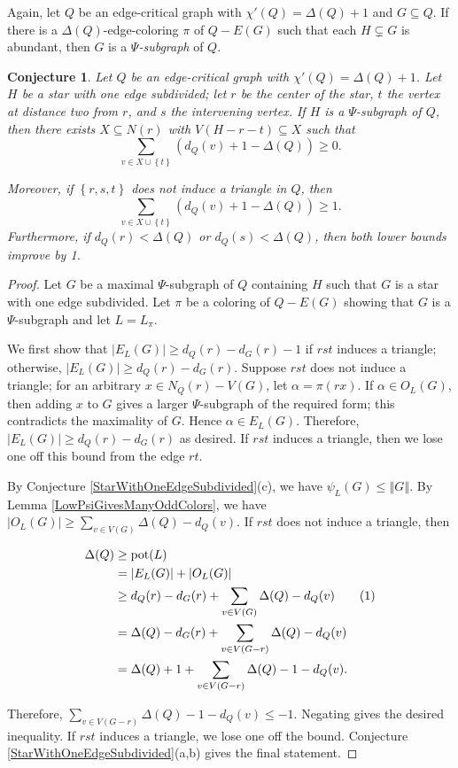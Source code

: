 \documentclass[12pt]{article}
\theoremstyle{plain}
\newtheorem{conjecture}[thm]{Conjecture}
\theoremstyle{definition}
\theoremstyle{remark}
\newcommand{\set}[1]{\left\{ #1 \right\}}
\newcommand{\card}[1]{\left|#1\right|}
\newcommand{\size}[1]{\left\Vert#1\right\Vert}
\newcommand{\pot}{\operatorname{pot}}
\newcommand\numberthis{\addtocounter{equation}{1}\tag{\theequation}}
\begin{document}
Again, let $Q$ be an edge-critical graph with $\chi'(Q) = \Delta(Q) + 1$ and $G
\subseteq Q$.  If there is a $\Delta(Q)$-edge-coloring $\pi$ of $Q - E(G)$ such
that each $H \subsetneq G$ is abundant, then $G$ is a \emph{$\Psi$-subgraph} of
$Q$.

\begin{conjecture}\label{AdjacencyPrecursor}
Let $Q$ be an edge-critical graph with $\chi'(Q) = \Delta(Q) + 1$.  
Let $H$ be a star with one edge subdivided; let $r$ be the center of the star,
$t$ the vertex at distance two from $r$, and $s$ the intervening vertex. 
If $H$ is a $\Psi$-subgraph of $Q$, 
then there exists $X \subseteq N(r)$ with $V(H - r - t)
\subseteq X$ such that \[\sum_{v \in X \cup \set{t}} (d_Q(v) + 1 - \Delta(Q))
\ge 0.\]  
	
\noindent Moreover, if $\set{r,s,t}$ does not induce a triangle in $Q$, then 
\[\sum_{v \in X \cup \set{t}} (d_Q(v) + 1 - \Delta(Q)) \ge 1.\]
Furthermore, if $d_Q(r)<\Delta(Q)$ or $d_Q(s)<\Delta(Q)$, then both lower
bounds improve by 1.
\end{conjecture}
\begin{proof}
Let $G$ be a maximal $\Psi$-subgraph of $Q$ containing $H$ such that $G$
is a star with one edge subdivided.  Let $\pi$ be a coloring of $Q - E(G)$
showing that $G$ is a $\Psi$-subgraph and let $L = L_\pi$.  
	
We first show that $\card{E_{L}(G)} \ge d_Q(r) - d_G(r) - 1$ if $rst$ induces a
triangle; otherwise, $\card{E_{L}(G)} \ge d_Q(r) - d_G(r)$.
Suppose $rst$ does not induce a triangle; for an arbitrary $x \in N_Q(r) - V(G)$,
let $\alpha=\pi(rx)$.  If $\alpha \in O_{L}(G)$, then adding $x$ to $G$ gives a
larger $\Psi$-subgraph of the required form; this contradicts the maximality of
$G$.  Hence $\alpha \in E_{L}(G)$.  Therefore, $\card{E_{L}(G)} \ge d_Q(r) -
d_G(r)$ as desired.  If $rst$ induces a triangle, then we lose one off this
bound from the edge $rt$.
	
By Conjecture \ref{StarWithOneEdgeSubdivided}(c), we have $\psi_L(G) \le
\size{G}$.  By Lemma \ref{LowPsiGivesManyOddColors}, we have
$\card{O_{L}(G)} \ge \sum_{v \in V(G)} \Delta(Q) - d_Q(v)$.  If $rst$ does
not induce a triangle, then
	
\begin{align*}
\Delta(Q) &\ge \pot(L)\\
&= \card{E_{L}(G)} + \card{O_{L}(G)}\\
&\ge d_Q(r) - d_G(r) + \sum_{v \in V(G)} \Delta(Q) - d_Q(v) \numberthis
\label{strict-ineq}\\
&= \Delta(Q) - d_G(r) + \sum_{v \in V(G - r)} \Delta(Q) - d_Q(v)\\
&= \Delta(Q) + 1 +\sum_{v \in V(G - r)} \Delta(Q) - 1 - d_Q(v).
\end{align*}
	
Therefore, $\sum_{v \in V(G - r)} \Delta(Q) - 1 - d_Q(v) \le -1$.  Negating
gives the desired inequality.  If $rst$ induces a triangle, we lose one off the
bound.  Conjecture \ref{StarWithOneEdgeSubdivided}(a,b) gives the final statement.
\end{proof}
\end{document}
